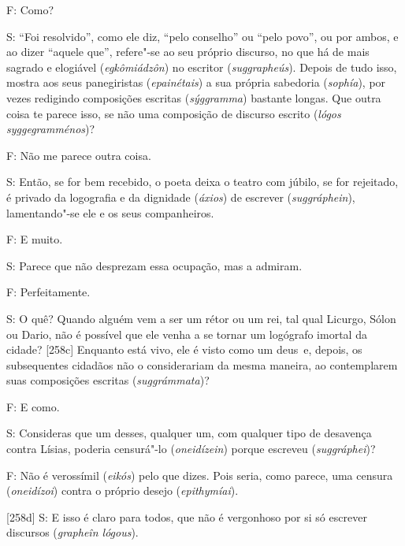  

F: Como?

 

S: ``Foi resolvido'', como ele diz, ``pelo conselho'' ou ``pelo povo'',
ou por ambos, e ao dizer ``aquele que'', refere"-se ao seu próprio
discurso, no que há de mais sagrado e elogiável (\emph{egkômiádzôn}) no
escritor (\emph{suggrapheús}). Depois de tudo isso, mostra aos seus
panegiristas (\emph{epainétais}) a sua própria sabedoria
(\emph{sophía}), por vezes redigindo composições escritas
(\emph{sýggramma}) bastante longas. Que outra coisa te parece isso,
se não uma composição de discurso escrito (\emph{lógos syggegramménos})?

 

F: Não me parece outra coisa.

 

S: Então, se for bem recebido, o poeta deixa o teatro com júbilo, se for
rejeitado, é privado da logografia e da dignidade (\emph{áxios}) de
escrever (\emph{suggráphein}), lamentando"-se ele e os seus companheiros.

 

F: E muito.

 

S: Parece que não desprezam essa ocupação, mas a admiram.

 

F: Perfeitamente.

 

S: O quê? Quando alguém vem a ser um rétor ou um rei, tal qual Licurgo,
Sólon ou Dario, não é possível que ele venha a se tornar um logógrafo
imortal da cidade? [258c] Enquanto está vivo, ele é visto como um
deus~e, depois, os subsequentes cidadãos não o considerariam da mesma
maneira, ao contemplarem suas composições escritas (\emph{suggrámmata})?

 

F: E como.

 

S: Consideras que um desses, qualquer um, com qualquer tipo de desavença
contra Lísias, poderia censurá"-lo (\emph{oneidízein}) porque escreveu
(\emph{suggráphei})?

 

F: Não é verossímil (\emph{eikós}) pelo que dizes. Pois seria, como
parece, uma censura (\emph{oneidízoi}) contra o próprio desejo
(\emph{epithymíai}).

 

[258d] S: E isso é claro para todos, que não é vergonhoso por si só
escrever discursos (\emph{grapheîn lógous}).

